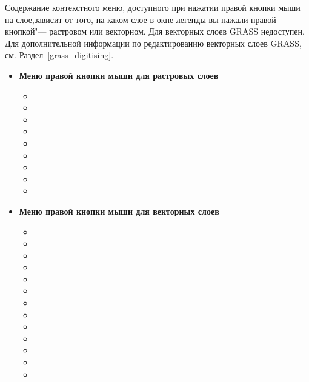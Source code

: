 Содержание контекстного меню, доступного при нажатии правой кнопки мыши
на слое,зависит от того, на каком слое в окне легенды вы нажали правой
кнопкой"--- растровом или векторном. Для векторных слоев GRASS
 недоступен. Для дополнительной
информации по редактированию векторных слоев GRASS,
см. Раздел~\ref{grass_digitising}.

\begin{itemize}

\item \textbf{Меню правой кнопки мыши для растровых слоев}
\begin{itemize}
\item {}
\item {}
\item {}
\item {}
\item {}
\item {}
\item {}
\item {}
\item {}
\end{itemize}

\item \textbf{Меню правой кнопки мыши для векторных слоев}
\begin{itemize}
\item {}
\item {}
\item {}
\item {}
\item {}
\item {}
\item {}
\item {}
\item {}
\item {}
\item {}
\item {}
\item {}
\end{itemize}


\end{itemize}
